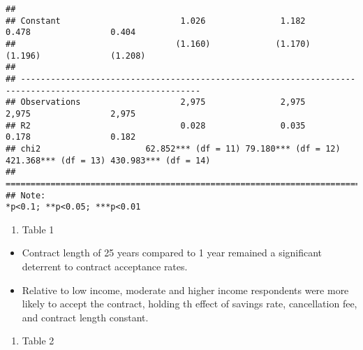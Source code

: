 \documentclass[
]{article}
\providecommand{\tightlist}{%
  \setlength{\itemsep}{0pt}\setlength{\parskip}{0pt}}
\begin{document}
\begin{verbatim}
##                                                                                                           
## Constant                        1.026               1.182               0.478                0.404        
##                                (1.160)             (1.170)             (1.196)              (1.208)       
##                                                                                                           
## ----------------------------------------------------------------------------------------------------------
## Observations                    2,975               2,975               2,975                2,975        
## R2                              0.028               0.035               0.178                0.182        
## chi2                     62.852*** (df = 11) 79.180*** (df = 12) 421.368*** (df = 13) 430.983*** (df = 14)
## ==========================================================================================================
## Note:                                                                          *p<0.1; **p<0.05; ***p<0.01
\end{verbatim}

\begin{enumerate}
\def\labelenumi{\arabic{enumi}.}
\tightlist
\item
  Table 1
\end{enumerate}

\begin{itemize}
\tightlist
\item
  Contract length of 25 years compared to 1 year remained a significant
  deterrent to contract acceptance rates.
\item
  Relative to low income, moderate and higher income respondents were
  more likely to accept the contract, holding th effect of savings rate,
  cancellation fee, and contract length constant.
\end{itemize}

\begin{enumerate}
\def\labelenumi{\arabic{enumi}.}
\setcounter{enumi}{1}
\tightlist
\item
  Table 2
\end{enumerate}
\end{document}

